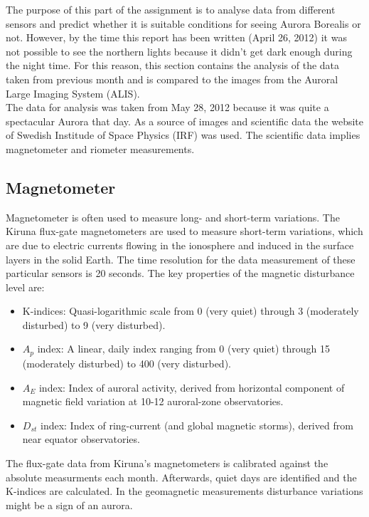 \documentclass{article}
\begin{document}
The purpose of this part of the assignment is to analyse data from different sensors and predict whether it is suitable conditions for seeing Aurora Borealis or not. However, by the time this report has been written (April 26, 2012) it was not possible to see the northern lights because it didn't get dark enough during the night time. For this reason, this section contains the analysis of the data taken from previous month and is compared to the images from the Auroral Large Imaging System (ALIS).
\\
The data for analysis was taken from May 28, 2012 because it was quite a spectacular Aurora that day. As a source of images and scientific data the website of Swedish Institude of Space Physics (IRF) was used. The scientific data implies magnetometer and riometer measurements.

\subsection{Magnetometer}
Magnetometer is often used to measure long- and short-term variations. The Kiruna flux-gate magnetometers are used to measure short-term variations, which are due to electric currents flowing in the ionosphere and induced in the surface layers in the solid Earth. The time resolution for the data measurement of these particular sensors is 20 seconds. The key properties of the magnetic disturbance level are:

\begin{itemize}
\item K-indices: Quasi-logarithmic scale from 0 (very quiet) through 3 (moderately disturbed) to 9 (very disturbed).
\item $A_p$ index: A linear, daily index ranging from 0 (very quiet) through 15 (moderately disturbed) to 400 (very disturbed).
\item $A_E$ index: Index of auroral activity, derived from horizontal component of magnetic field variation at 10-12 auroral-zone observatories.
\item $D_{st}$ index: Index of ring-current (and global magnetic storms), derived from near equator observatories.
\end{itemize}

The flux-gate data from Kiruna's magnetometers is calibrated against the absolute measurments each month. Afterwards, quiet days are identified and the K-indices are calculated. In the geomagnetic measurements disturbance variations might be a sign of an aurora.
\end{document}
